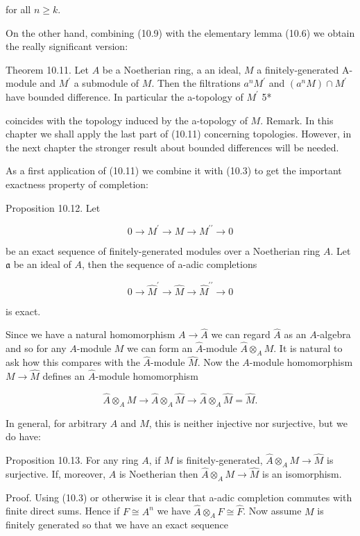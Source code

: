 \documentclass{standalone}
\theoremstyle{definition}
\theoremstyle{remark}
\begin{document}
for all $n \geqslant k$.

On the other hand, combining (10.9) with the elementary lemma (10.6) we obtain the really significant version:

Theorem 10.11. Let $A$ be a Noetherian ring, a an ideal, $M$ a finitely-generated A-module and $M^{\prime}$ a submodule of $M$. Then the filtrations $a^{n} M^{\prime}$ and $\left(a^{n} M\right) \cap M^{\prime}$ have bounded difference. In particular the a-topology of $M^{\prime}$ 5*

coincides with the topology induced by the a-topology of $M$. Remark. In this chapter we shall apply the last part of (10.11) concerning topologies. However, in the next chapter the stronger result about bounded differences will be needed.

As a first application of (10.11) we combine it with (10.3) to get the important exactness property of completion:

Proposition 10.12. Let

\[
0 \rightarrow M^{\prime} \rightarrow M \rightarrow M^{\prime \prime} \rightarrow 0
\]

be an exact sequence of finitely-generated modules over a Noetherian ring $A$. Let $\mathfrak{a}$ be an ideal of $A$, then the sequence of a-adic completions

\[
0 \rightarrow \hat{M}^{\prime} \rightarrow \hat{M} \rightarrow \hat{M}^{\prime \prime} \rightarrow 0
\]

is exact.

Since we have a natural homomorphism $A \rightarrow \hat{A}$ we can regard $\hat{A}$ as an $A$-algebra and so for any $A$-module $M$ we can form an $\hat{A}$-module $\hat{A} \otimes_{A} M$. It is natural to ask how this compares with the $\hat{A}$-module $\hat{M}$. Now the $A$-module homomorphism $M \rightarrow \hat{M}$ defines an $\hat{A}$-module homomorphism

\[
\hat{A} \otimes_{A} M \rightarrow \hat{A} \otimes_{A} \hat{M} \rightarrow \hat{A} \otimes_{A} \hat{M}=\hat{M} .
\]

In general, for arbitrary $A$ and $M$, this is neither injective nor surjective, but we do have:

Proposition 10.13. For any ring $A$, if $M$ is finitely-generated, $\hat{A} \otimes_{A} M \rightarrow \hat{M}$ is surjective. If, moreover, $A$ is Noetherian then $\hat{A} \otimes_{A} M \rightarrow \hat{M}$ is an isomorphism.

Proof. Using (10.3) or otherwise it is clear that a-adic completion commutes with finite direct sums. Hence if $F \cong A^{n}$ we have $\hat{A} \otimes_{A} F \cong \hat{F}$. Now assume $M$ is finitely generated so that we have an exact sequence
\end{document}

